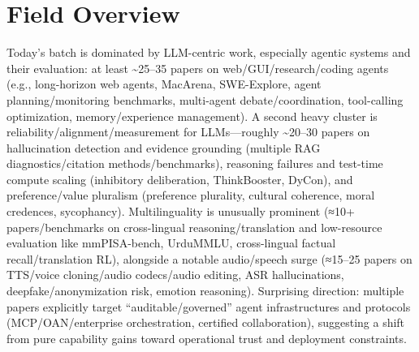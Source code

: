 \documentclass[12pt,letterpaper]{article}
\begin{document}
\medskip



\section*{Field Overview}
{\footnotesize Today's batch is dominated by LLM-centric work, especially agentic systems and their evaluation: at least \textasciitilde{}25--35 papers on web/GUI/research/coding agents (e.g., long-horizon web agents, MacArena, SWE-Explore, agent planning/monitoring benchmarks, multi-agent debate/coordination, tool-calling optimization, memory/experience management). A second heavy cluster is reliability/alignment/measurement for LLMs---roughly \textasciitilde{}20--30 papers on hallucination detection and evidence grounding (multiple RAG diagnostics/citation methods/benchmarks), reasoning failures and test-time compute scaling (inhibitory deliberation, ThinkBooster, DyCon), and preference/value pluralism (preference plurality, cultural coherence, moral credences, sycophancy). Multilinguality is unusually prominent (≈10+ papers/benchmarks on cross-lingual reasoning/translation and low-resource evaluation like mmPISA-bench, UrduMMLU, cross-lingual factual recall/translation RL), alongside a notable audio/speech surge (≈15--25 papers on TTS/voice cloning/audio codecs/audio editing, ASR hallucinations, deepfake/anonymization risk, emotion reasoning). Surprising direction: multiple papers explicitly target ``auditable/governed'' agent infrastructures and protocols (MCP/OAN/enterprise orchestration, certified collaboration), suggesting a shift from pure capability gains toward operational trust and deployment constraints.}
\end{document}
